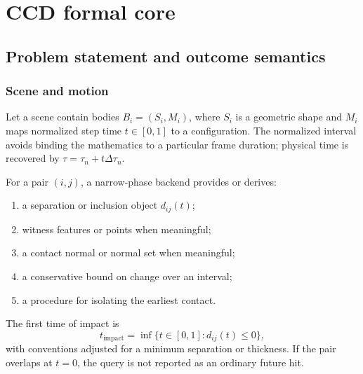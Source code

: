 \documentclass[11pt,a4paper,openany]{book}
\newcommand{\sepfn}{d_{ij}}
\newcommand{\TOI}{t_{\mathrm{impact}}}
\begin{document}
\part{CCD formal core}

\chapter{Problem statement and outcome semantics}
\section{Scene and motion}
Let a scene contain bodies $B_i=(S_i,M_i)$, where $S_i$ is a geometric shape and $M_i$ maps normalized step time $t\in[0,1]$ to a configuration. The normalized interval avoids binding the mathematics to a particular frame duration; physical time is recovered by $\tau=\tau_n+t\Delta\tau_n$.

For a pair $(i,j)$, a narrow-phase backend provides or derives:
\begin{enumerate}
  \item a separation or inclusion object $\sepfn(t)$;
  \item witness features or points when meaningful;
  \item a contact normal or normal set when meaningful;
  \item a conservative bound on change over an interval;
  \item a procedure for isolating the earliest contact.
\end{enumerate}

The first time of impact is
\begin{equation}
  \TOI = \inf\{t\in[0,1]:\sepfn(t)\le 0\},
\end{equation}
with conventions adjusted for a minimum separation or thickness. If the pair overlaps at $t=0$, the query is not reported as an ordinary future hit.
\end{document}
